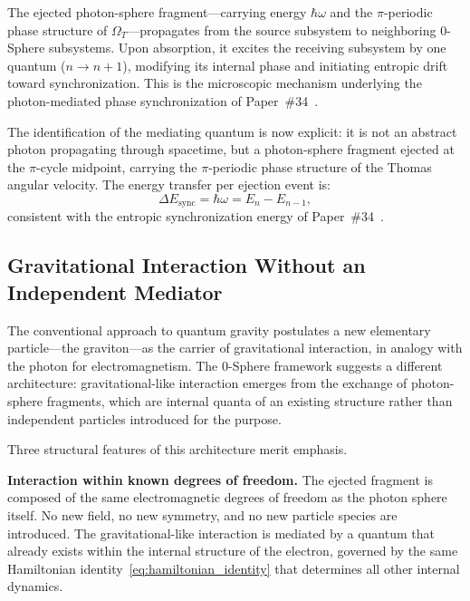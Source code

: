 \documentclass[%
 reprint, amsmath,amssymb, aps, prb, ]{revtex4-2}
\numberwithin{equation}{section}
\begin{document}
The ejected photon-sphere fragment---carrying energy $\hbar\omega$ and the $\pi$-periodic phase structure of $\Omega_T$---propagates from the source subsystem to neighboring 0-Sphere subsystems. Upon absorption, it excites the receiving subsystem by one quantum ($n \to n+1$), modifying its internal phase and initiating entropic drift toward synchronization. This is the microscopic mechanism underlying the photon-mediated phase synchronization of Paper~\#34~\cite{hanamura34}.

The identification of the mediating quantum is now explicit: it is not an abstract photon propagating through spacetime, but a photon-sphere fragment ejected at the $\pi$-cycle midpoint, carrying the $\pi$-periodic phase structure of the Thomas angular velocity. The energy transfer per ejection event is:
\begin{equation}
\Delta E_{\text{sync}} = \hbar\omega = E_n - E_{n-1},
\label{eq:sync_quantum}
\end{equation}
consistent with the entropic synchronization energy of Paper~\#34~\cite{hanamura34}.

\subsection{Gravitational Interaction Without an Independent Mediator}
\label{sec:graviton_arch}

The conventional approach to quantum gravity postulates a new elementary particle---the graviton---as the carrier of gravitational interaction, in analogy with the photon for electromagnetism. The 0-Sphere framework suggests a different architecture: gravitational-like interaction emerges from the exchange of photon-sphere fragments, which are internal quanta of an existing structure rather than independent particles introduced for the purpose.

Three structural features of this architecture merit emphasis.

\textbf{Interaction within known degrees of freedom.} The ejected fragment is composed of the same electromagnetic degrees of freedom as the photon sphere itself. No new field, no new symmetry, and no new particle species are introduced. The gravitational-like interaction is mediated by a quantum that already exists within the internal structure of the electron, governed by the same Hamiltonian identity~\eqref{eq:hamiltonian_identity} that determines all other internal dynamics.
\end{document}
